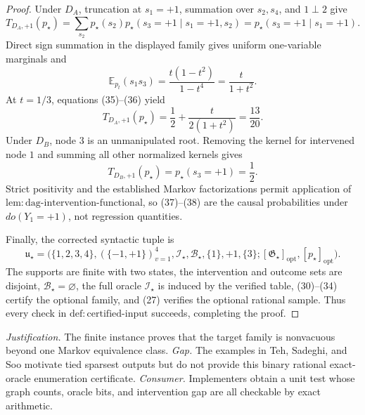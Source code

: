 \documentclass{article}
\begin{document}
\begin{proof}
Under \(D_A\), truncation at \(s_1=+1\), summation over \(s_2,s_4\), and \(1\perp2\) give
\[
 T_{D_A,+1}(p_\star)
 =\sum_{s_2}p_\star(s_2)
 p_\star(s_3=+1\mid s_1=+1,s_2)
 =p_\star(s_3=+1\mid s_1=+1). \tag{35}
\]
Direct sign summation in the displayed family gives uniform one-variable marginals and
\[
 \mathbb E_{p_t}(s_1s_3)
 =\frac{t(1-t^2)}{1-t^4}=\frac{t}{1+t^2}. \tag{36}
\]
At \(t=1/3\), equations (35)--(36) yield
\[
 T_{D_A,+1}(p_\star)
 =\frac12+\frac{t}{2(1+t^2)}=\frac{13}{20}. \tag{37}
\]
Under \(D_B\), node \(3\) is an unmanipulated root.  Removing the kernel for intervened node \(1\) and summing all other normalized kernels gives
\[
 T_{D_B,+1}(p_\star)=p_\star(s_3=+1)=\frac12. \tag{38}
\]
Strict positivity and the established Markov factorizations permit application of \(\mathrm{lem{:}dag\text{-}intervention\text{-}functional}\), so (37)--(38) are the causal probabilities under \(do(Y_1=+1)\), not regression quantities.

Finally, the corrected syntactic tuple is
\[
 \mathfrak u_\star=
 \bigl(\{1,2,3,4\},(\{-1,+1\})_{v=1}^4,
 \mathcal I_\star,\mathcal B_\star,\{1\},+1,\{3\};
 [\mathfrak G_\star]_{\mathrm{opt}},[p_\star]_{\mathrm{opt}}\bigr). \tag{39}
\]
The supports are finite with two states, the intervention and outcome sets are disjoint, \(\mathcal B_\star=\varnothing\), the full oracle \(\mathcal I_\star\) is induced by the verified table, (30)--(34) certify the optional family, and (27) verifies the optional rational sample.  Thus every check in \(\mathrm{def{:}certified\text{-}input}\) succeeds, completing the proof.
\end{proof}
\par\smallskip\noindent \textit{Justification.} The finite instance proves that the target family is nonvacuous beyond one Markov equivalence class. \textit{Gap.} The examples in Teh, Sadeghi, and Soo motivate tied sparsest outputs but do not provide this binary rational exact-oracle enumeration certificate. \textit{Consumer.} Implementers obtain a unit test whose graph counts, oracle bits, and intervention gap are all checkable by exact arithmetic.
\end{document}

